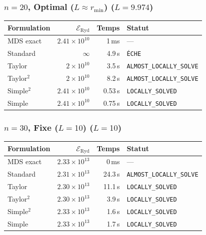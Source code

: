 \subsubsection{$n=20$, Optimal ($L{\approx}r_{\min}$) ($L=9.974$)}
\begin{longtable}{@{}lrrl@{}}
  \toprule
  Formulation & $\mathcal{E}_{\mathrm{Ryd}}$ & Temps & Statut \\
  \midrule
  \endhead
  MDS exact & $2.41\times10^{10}$ & 1\,ms & --- \\
  Standard & $\infty$ & 4.9\,s & \texttt{ÉCHE} \\
  Taylor & $2\times10^{10}$ & 3.5\,s & \texttt{ALMOST\_LOCALLY\_SOLVE} \\
  Taylor$^2$ & $2\times10^{10}$ & 8.2\,s & \texttt{ALMOST\_LOCALLY\_SOLVE} \\
  Simple$^2$ & $2.41\times10^{10}$ & 0.53\,s & \texttt{LOCALLY\_SOLVED} \\
  Simple & $2.41\times10^{10}$ & 0.75\,s & \texttt{LOCALLY\_SOLVED} \\
  \bottomrule
\end{longtable}

\subsubsection{$n=30$, Fixe ($L{=}10$) ($L=10$)}
\begin{longtable}{@{}lrrl@{}}
  \toprule
  Formulation & $\mathcal{E}_{\mathrm{Ryd}}$ & Temps & Statut \\
  \midrule
  \endhead
  MDS exact & $2.33\times10^{13}$ & 0\,ms & --- \\
  Standard & $2.31\times10^{13}$ & 24.3\,s & \texttt{ALMOST\_LOCALLY\_SOLVE} \\
  Taylor & $2.30\times10^{13}$ & 11.1\,s & \texttt{LOCALLY\_SOLVED} \\
  Taylor$^2$ & $2.30\times10^{13}$ & 3.9\,s & \texttt{LOCALLY\_SOLVED} \\
  Simple$^2$ & $2.33\times10^{13}$ & 1.6\,s & \texttt{LOCALLY\_SOLVED} \\
  Simple & $2.33\times10^{13}$ & 1.7\,s & \texttt{LOCALLY\_SOLVED} \\
  \bottomrule
\end{longtable}

